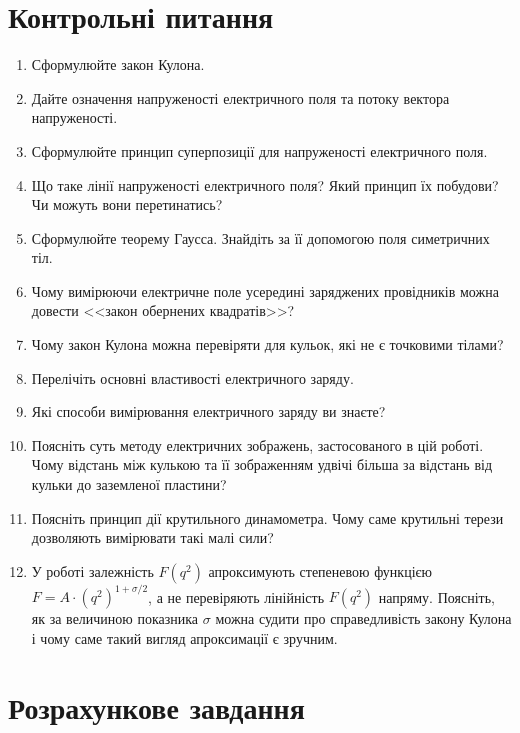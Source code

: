 \section*{Контрольні питання}

\begin{enumerate}
	\item Сформулюйте закон Кулона.
    \item Дайте означення напруженості електричного поля та потоку вектора напруженості.
    \item Сформулюйте принцип суперпозиції для напруженості електричного поля.
    \item Що таке лінії напруженості електричного поля? Який принцип їх побудови? Чи можуть вони перетинатись?
    \item Сформулюйте теорему Гаусса. Знайдіть за її допомогою поля симетричних тіл.
    \item Чому вимірюючи електричне поле усередині заряджених провідників можна довести <<закон обернених квадратів>>?
    \item Чому закон Кулона можна перевіряти для кульок, які не є точковими тілами?
    \item Перелічіть основні властивості електричного заряду.
    \item Які способи вимірювання електричного заряду ви знаєте?
    \item Поясніть суть методу електричних зображень, застосованого в цій роботі. Чому відстань між кулькою та її зображенням удвічі більша за відстань від кульки до заземленої пластини?
    \item Поясніть принцип дії крутильного динамометра. Чому саме крутильні терези дозволяють вимірювати такі малі сили?
    \item У роботі залежність $F(q^2)$ апроксимують степеневою функцією $F = A\cdot(q^2)^{1+\sigma/2}$, а не перевіряють лінійність $F(q^2)$ напряму. Поясніть, як за величиною показника $\sigma$ можна судити про справедливість закону Кулона і чому саме такий вигляд апроксимації є зручним.
\end{enumerate}

\section*{Розрахункове завдання}

